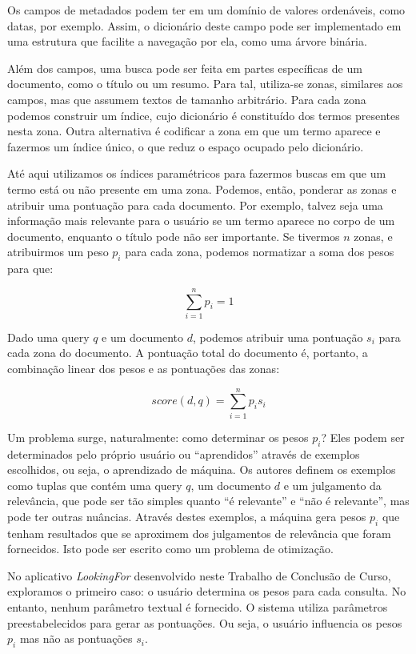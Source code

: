 Os campos de metadados podem ter em um domínio de valores ordenáveis, como datas, por exemplo. Assim, o dicionário deste campo pode ser implementado em uma estrutura que facilite a navegação por ela, como uma árvore binária.

Além dos campos, uma busca pode ser feita em partes específicas de um documento, como o título ou um resumo. Para tal, utiliza-se zonas, similares aos campos, mas que assumem textos de tamanho arbitrário. Para cada zona podemos construir um índice, cujo dicionário é constituído dos termos presentes nesta zona. Outra alternativa é codificar a zona em que um termo aparece e fazermos um índice único, o que reduz o espaço ocupado pelo dicionário.

Até aqui utilizamos os índices paramétricos para fazermos buscas em que um termo está ou não presente em uma zona. Podemos, então, ponderar as zonas e atribuir uma pontuação para cada documento. Por exemplo, talvez seja uma informação mais relevante para o usuário se um termo aparece no corpo de um documento, enquanto o título pode não ser importante. Se tivermos $n$ zonas, e atribuirmos um peso $p_{i}$ para cada zona, podemos normatizar a soma dos pesos para que:

\begin{displaymath}
	\sum_{i=1}^{n} p_{i} = 1
\end{displaymath}

Dado uma query $q$ e um documento $d$, podemos atribuir uma pontuação $s_{i}$ para cada zona do documento. A pontuação total do documento é, portanto, a combinação linear dos pesos e as pontuações das zonas:

\begin{equation}
	score(d,q)= \sum_{i=1}^{n} p_{i} s_{i}
	 \label{score}
\end{equation}

Um problema surge, naturalmente: como determinar os pesos $p_{i}$? Eles podem ser determinados pelo próprio usuário ou ``aprendidos'' através de exemplos escolhidos, ou seja, o aprendizado de máquina. Os autores definem os exemplos como tuplas que contém uma query $q$, um documento $d$ e um julgamento da relevância, que pode ser tão simples quanto ``é relevante'' e ``não é relevante'', mas pode ter outras nuâncias. Através destes exemplos, a máquina gera pesos $p_{i}$ que tenham resultados que se aproximem dos julgamentos de relevância que foram fornecidos. Isto pode ser escrito como um problema de otimização.

No aplicativo \emph{LookingFor} desenvolvido neste Trabalho de Conclusão de Curso, exploramos o primeiro caso: o usuário determina os pesos para cada consulta. No entanto, nenhum parâmetro textual é fornecido. O sistema utiliza parâmetros preestabelecidos para gerar as pontuações. Ou seja, o usuário influencia os pesos $p_{i}$ mas não as pontuações $s_{i}$.